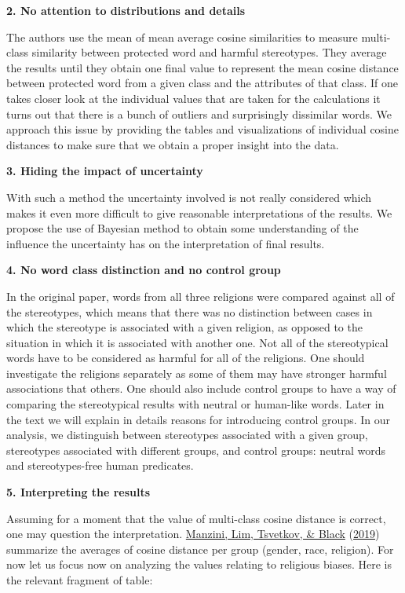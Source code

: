 \documentclass[
  12pt,
]{book}
\begin{document}
\textbf{2. No attention to distributions and details}

The authors use the mean of mean average cosine similarities to measure multi-class similarity between protected word and harmful stereotypes. They average the results until they obtain one final value to represent the mean cosine distance between protected word from a given class and the attributes of that class. If one takes closer look at the individual values that are taken for the calculations it turns out that there is a bunch of outliers and surprisingly dissimilar words. We approach this issue by providing the tables and visualizations of individual cosine distances to make sure that we obtain a proper insight into the data.

\textbf{3. Hiding the impact of uncertainty}

With such a method the uncertainty involved is not really considered which makes it even more difficult to give reasonable interpretations of the results. We propose the use of Bayesian method to obtain some understanding of the influence the uncertainty has on the interpretation of final results.

\textbf{4. No word class distinction and no control group}

In the original paper, words from all three religions were compared against all of the stereotypes, which means that there was no distinction between cases in which the stereotype is associated with a given religion, as opposed to the situation in which it is associated with another one. Not all of the stereotypical words have to be considered as harmful for all of the religions. One should investigate the religions separately as some of them may have stronger harmful associations that others. One should also include control groups to have a way of comparing the stereotypical results with neutral or human-like words. Later in the text we will explain in details reasons for introducing control groups. In our analysis, we distinguish between stereotypes associated with a given group, stereotypes associated with different groups, and control groups: neutral words and stereotypes-free human predicates.

\textbf{5. Interpreting the results}

Assuming for a moment that the value of multi-class cosine distance is correct, one may question the interpretation. \protect\hyperlink{ref-Manzini2019blackToCriminal}{Manzini, Lim, Tsvetkov, \& Black} (\protect\hyperlink{ref-Manzini2019blackToCriminal}{2019}) summarize the averages of cosine distance per group (gender, race, religion). For now let us focus now on analyzing the values relating to religious biases. Here is the relevant fragment of table:
\end{document}
